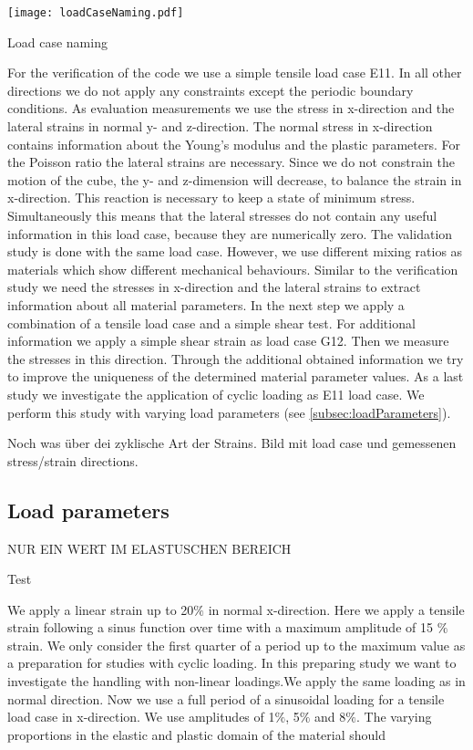     \begin{table}[H]
        \centering
        \texttt{[image: loadCaseNaming.pdf]}
		\caption{Load case naming}
		\label{tab:loadCaseNaming}
    \end{table}

    For the verification of the code we use a simple tensile load case E11.
    In all other directions we do not apply any constraints except the periodic boundary conditions. As evaluation measurements we use the stress in x-direction and the lateral strains in normal y- and z-direction. The normal stress in x-direction contains information about the Young's modulus and the plastic parameters. For the Poisson ratio the lateral strains are necessary. Since we do not constrain the motion of the cube, the y- and z-dimension will decrease, to balance the strain in x-direction. This reaction is necessary to keep a state of minimum stress. Simultaneously this means that the lateral stresses do not contain any useful information in this load case, because they are numerically zero. 
    The validation study is done with the same load case. However, we use different mixing ratios as materials which show different mechanical behaviours. Similar to the verification study we need the stresses in x-direction and the lateral strains to extract information about all material parameters. 
    In the next step we apply a combination of a tensile load case and a simple shear test.  For additional information we apply a simple shear strain as load case G12. Then we measure the stresses in this direction. Through the additional obtained information we try to improve the uniqueness of the determined material parameter values.
    As a last study we investigate the application of cyclic loading as E11 load case. We perform this study with varying load parameters (see \autoref{subsec:loadParameters}). 
    
    Noch was über dei zyklische Art der Strains. Bild mit load case und gemessenen stress/strain directions.

    
    

    \subsection{Load parameters}\label{subsec:loadParameters}
    NUR EIN WERT IM ELASTUSCHEN BEREICH

    Test

     We apply a linear strain up to 20\(\%\) in normal x-direction.
     Here we apply a tensile strain following a sinus function over time with a maximum amplitude of 15 \(\%\) strain. We only consider the first quarter of a period up to the maximum value as a preparation for studies with cyclic loading. In this preparing study we want to investigate the handling with non-linear loadings.We apply the same loading as in normal direction. Now we use a full period of a sinusoidal loading for a tensile load case in x-direction. We use amplitudes of 1\(\%\), 5\(\%\) and 8\(\%\). The varying proportions in the elastic and plastic domain of the material should 

